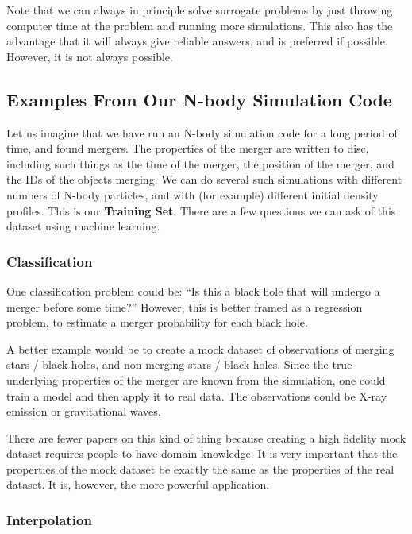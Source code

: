 \documentclass[12pt]{article}
\begin{document}
Note that we can always in principle solve surrogate problems by just throwing computer time at the problem and running more simulations. This also has the advantage that it will always give reliable answers, and is preferred if possible. However, it is not always possible.

\subsection{Examples From Our N-body Simulation Code}

Let us imagine that we have run an N-body simulation code for a long period of time, and found mergers. The properties of the merger are written to disc, including such things as the time of the merger, the position of the merger, and the IDs of the objects merging. We can do several such simulations with different numbers of N-body particles, and with (for example) different initial density profiles. This is our \textbf{Training Set}. There are a few questions we can ask of this dataset using machine learning.

\subsubsection{Classification}

One classification problem could be: ``Is this a black hole that will undergo a merger before some time?'' However, this is better framed as a regression problem, to estimate a merger probability for each black hole.

A better example would be to create a mock dataset of observations of merging stars / black holes, and non-merging stars / black holes. Since the true underlying properties of the merger are known from the simulation, one could train a model and then apply it to real data. The observations could be X-ray emission or gravitational waves.

There are fewer papers on this kind of thing because creating a high fidelity mock dataset requires people to have domain knowledge. It is very important that the properties of the mock dataset be exactly the same as the properties of the real dataset. It is, however, the more powerful application.

\subsubsection{Interpolation}
\end{document}
